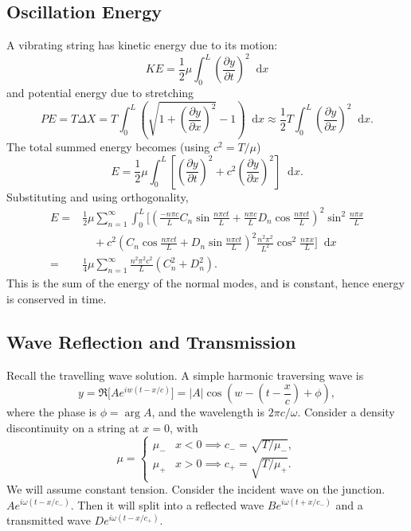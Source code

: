 \documentclass[12pt]{article}
\newcommand{\diff}{\mathop{}\!\mathrm{d}}
\theoremstyle{definition}
\theoremstyle{remark}
\begin{document}
\subsection{Oscillation Energy}%
\label{sub:oscillation_energy}

A vibrating string has kinetic energy due to its motion:
\[
	KE = \frac{1}{2} \mu \int_{0}^{L} \left( \frac{\partial y}{\partial t}\right)^2 \diff x
\]
and potential energy due to stretching
\[
	PE = T \Delta X = T \int_{0}^{L} \left( \sqrt{1 + \left( \frac{\partial y}{\partial x} \right)^2} - 1 \right) \diff x \approx \frac{1}{2} T \int_{0}^{L} \left( \frac{\partial y}{\partial x}\right)^2 \diff x
.\]
The total summed energy becomes (using $c^2 = T/\mu$)
\[
	E = \frac{1}{2} \mu \int_{0}^{L} \left[ \left( \frac{\partial y}{\partial t} \right)^2 + c^2 \left( \frac{\partial y}{\partial x} \right)^2 \right] \diff x
.\]
Substituting and using orthogonality,
\begin{align*}
	E =& \frac{1}{2} \mu \sum_{n = 1}^{\infty} \int_{0}^{L} \biggl[ \left( \frac{- n \pi c}{L} C_n \sin \frac{n \pi c t}{L} + \frac{n \pi c}{L}D_n \cos \frac{n \pi c t}{L} \right)^2 \sin^2 \frac{n \pi x}{L} \\
	  & \quad + c^2 \left( C_n \cos \frac{n \pi c t}{L} + D_n \sin \frac{n \pi c t}{L} \right)^2 \frac{n^2 \pi^2}{L^2} \cos^2 \frac{n \pi x}{L} \biggr]\diff x \\
		=& \frac{1}{4} \mu \sum_{n = 1}^{\infty} \frac{n^2 \pi^2 c^2}{L}(C_n^2 + D_n^2).
\end{align*}
This is the sum of the energy of the normal modes, and is constant, hence energy is conserved in time.

\subsection{Wave Reflection and Transmission}%
\label{sub:wave_reflection_and_transmission}

Recall the travelling wave solution. A simple harmonic traversing wave is
\[
	y = \Re \bigl[ A e^{iw (t - x/c)} \bigr] = |A| \cos \left( w - \left( t - \frac{x}{c} \right) + \phi \right)
,\]
where the phase is $\phi = \arg A$, and the wavelength is $2 \pi c / \omega$. Consider a density discontinuity on a string at $x = 0$, with
\[
\mu =
\begin{cases}
	\mu_{-} & x < 0 \implies c_{-} = \sqrt{T/\mu_{-}}, \\
	\mu_{+} & x > 0 \implies c_{+} = \sqrt{T/\mu_{+}}.
\end{cases}
\]
We will assume constant tension. Consider the incident wave on the junction. $Ae^{i \omega(t - x/c_{-})}$. Then it will split into a reflected wave $Be^{i \omega(t + x/c_{-})}$ and a transmitted wave $De^{i\omega(t - x/c_{+})}$. 
\end{document}
